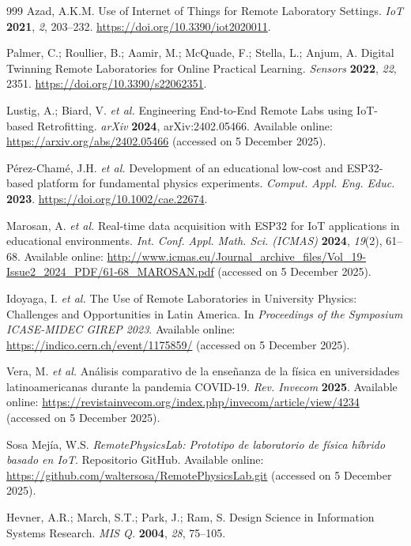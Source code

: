 \documentclass[journal,article,submit,pdftex]{Definitions/mdpi}
\begin{document}
\begin{thebibliography}{999}
Azad, A.K.M.
Use of Internet of Things for Remote Laboratory Settings.
\textit{IoT} \textbf{2021}, \textit{2}, 203--232.
\href{https://doi.org/10.3390/iot2020011}{https://doi.org/10.3390/iot2020011}.

Palmer, C.; Roullier, B.; Aamir, M.; McQuade, F.; Stella, L.; Anjum, A.
Digital Twinning Remote Laboratories for Online Practical Learning.
\textit{Sensors} \textbf{2022}, \textit{22}, 2351.
\href{https://doi.org/10.3390/s22062351}{https://doi.org/10.3390/s22062351}.

Lustig, A.; Biard, V. \textit{et al.}
Engineering End-to-End Remote Labs using IoT-based Retrofitting.
\textit{arXiv} \textbf{2024}, arXiv:2402.05466.
Available online: \url{https://arxiv.org/abs/2402.05466} (accessed on 5 December 2025).

P\'erez-Cham\'e, J.H. \textit{et al.}
Development of an educational low-cost and ESP32-based platform for fundamental physics experiments.
\textit{Comput. Appl. Eng. Educ.} \textbf{2023}.
\href{https://doi.org/10.1002/cae.22674}{https://doi.org/10.1002/cae.22674}.

Marosan, A. \textit{et al.}
Real-time data acquisition with ESP32 for IoT applications in educational environments.
\textit{Int. Conf. Appl. Math. Sci. (ICMAS)} \textbf{2024}, \textit{19}(2), 61--68.
Available online: \url{http://www.icmas.eu/Journal_archive_files/Vol_19-Issue2_2024_PDF/61-68_MAROSAN.pdf} (accessed on 5 December 2025).

Idoyaga, I. \textit{et al.}
The Use of Remote Laboratories in University Physics: Challenges and Opportunities in Latin America.
In \textit{Proceedings of the Symposium ICASE-MIDEC GIREP 2023}.
Available online: \url{https://indico.cern.ch/event/1175859/} (accessed on 5 December 2025).

Vera, M. \textit{et al.}
An\'alisis comparativo de la ense\~nanza de la f\'isica en universidades latinoamericanas durante la pandemia COVID-19.
\textit{Rev. Invecom} \textbf{2025}.
Available online: \url{https://revistainvecom.org/index.php/invecom/article/view/4234} (accessed on 5 December 2025).

Sosa Mej\'ia, W.S.
\textit{RemotePhysicsLab: Prototipo de laboratorio de f\'isica h\'ibrido basado en IoT}.
Repositorio GitHub.
Available online: \url{https://github.com/waltersosa/RemotePhysicsLab.git} (accessed on 5 December 2025).

Hevner, A.R.; March, S.T.; Park, J.; Ram, S.
Design Science in Information Systems Research.
\textit{MIS Q.} \textbf{2004}, \textit{28}, 75--105.


\end{thebibliography}
\end{document}
